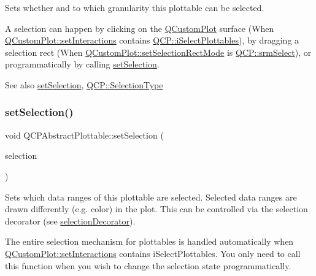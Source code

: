 Sets whether and to which granularity this plottable can be selected.

A selection can happen by clicking on the \mbox{\hyperlink{class_q_custom_plot}{Q\+Custom\+Plot}} surface (When \mbox{\hyperlink{class_q_custom_plot_a5ee1e2f6ae27419deca53e75907c27e5}{Q\+Custom\+Plot\+::set\+Interactions}} contains \mbox{\hyperlink{namespace_q_c_p_a2ad6bb6281c7c2d593d4277b44c2b037a67148c8227b4155eca49135fc274c7ec}{Q\+C\+P\+::i\+Select\+Plottables}}), by dragging a selection rect (When \mbox{\hyperlink{class_q_custom_plot_a810ef958ebe84db661c7288b526c0deb}{Q\+Custom\+Plot\+::set\+Selection\+Rect\+Mode}} is \mbox{\hyperlink{namespace_q_c_p_ac9aa4d6d81ac76b094f9af9ad2d3aacfa62c286e8da283a0cbb88ecac2f3f7506}{Q\+C\+P\+::srm\+Select}}), or programmatically by calling \mbox{\hyperlink{class_q_c_p_abstract_plottable_a219bc5403a9d85d3129165ec3f5ae436}{set\+Selection}}.

\begin{DoxySeeAlso}{See also}
\mbox{\hyperlink{class_q_c_p_abstract_plottable_a219bc5403a9d85d3129165ec3f5ae436}{set\+Selection}}, \mbox{\hyperlink{namespace_q_c_p_ac6cb9db26a564b27feda362a438db038}{Q\+C\+P\+::\+Selection\+Type}} 
\end{DoxySeeAlso}
\mbox{\label{class_q_c_p_abstract_plottable_a219bc5403a9d85d3129165ec3f5ae436}} 
\subsubsection{\texorpdfstring{setSelection()}{setSelection()}}
{\footnotesize\ttfamily void Q\+C\+P\+Abstract\+Plottable\+::set\+Selection (\begin{DoxyParamCaption}\item[{\mbox{\hyperlink{class_q_c_p_data_selection}{Q\+C\+P\+Data\+Selection}}}]{selection }\end{DoxyParamCaption})}

Sets which data ranges of this plottable are selected. Selected data ranges are drawn differently (e.\+g. color) in the plot. This can be controlled via the selection decorator (see \mbox{\hyperlink{class_q_c_p_abstract_plottable_a7861518e47ca0c6a0c386032c2db075e}{selection\+Decorator}}).

The entire selection mechanism for plottables is handled automatically when \mbox{\hyperlink{class_q_custom_plot_a5ee1e2f6ae27419deca53e75907c27e5}{Q\+Custom\+Plot\+::set\+Interactions}} contains i\+Select\+Plottables. You only need to call this function when you wish to change the selection state programmatically.

